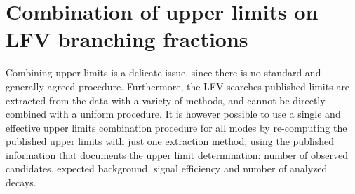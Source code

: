 \section{Combination of upper limits on \mtau LFV branching fractions}
\label{sec:tau:lfv-comb}
\newcommand{\cls}{\ensuremath{\text{CL}_s}\xspace}
\newcommand{\clsb}{\ensuremath{\text{CL}_{s+b}}\xspace}
\newcommand{\clb}{\ensuremath{\text{CL}_b}\xspace}

Combining upper limits is a delicate issue, since there is no standard and
generally agreed procedure. Furthermore, the \mtau LFV searches
published limits are extracted from the data with a variety of
methods, and cannot be directly combined with a uniform procedure. It
is however possible to use a single and effective
upper limits combination procedure for all modes by re-computing the published upper
limits with just one extraction method, using the published
information that documents the upper limit determination:
number of observed candidates, expected background, signal efficiency and
number of analyzed \mtau decays.

